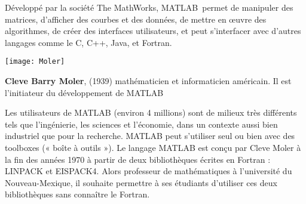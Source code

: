 Développé par la société The MathWorks, MATLAB\textregistered~permet de manipuler des matrices,
d'afficher des courbes et des données, de mettre en œuvre des algorithmes, 
de créer des interfaces utilisateurs, et peut s’interfacer avec d’autres 
langages comme le C, C++, Java, et Fortran.
\begin{marginfigure}
    \centering
    \texttt{[image: Moler]}
    \caption*{\textbf{Cleve Barry Moler}, (1939) 
              mathématicien et informaticien américain. Il est l'initiateur 
              du développement de MATLAB}
\end{marginfigure}
Les utilisateurs de MATLAB (environ 4 millions) sont de milieux très différents 
tels que l’ingénierie, les sciences et l’économie, dans un contexte aussi 
bien industriel que pour la recherche.
MATLAB peut s'utiliser seul ou bien avec des toolboxes (« boîte à outils »).
Le langage MATLAB est conçu par Cleve Moler à la fin des années 1970 à partir 
de deux bibliothèques écrites en Fortran : LINPACK et EISPACK4.
Alors professeur de mathématiques à l'université du Nouveau-Mexique, 
il souhaite permettre à ses étudiants d'utiliser ces deux bibliothèques sans 
connaître le Fortran. 
